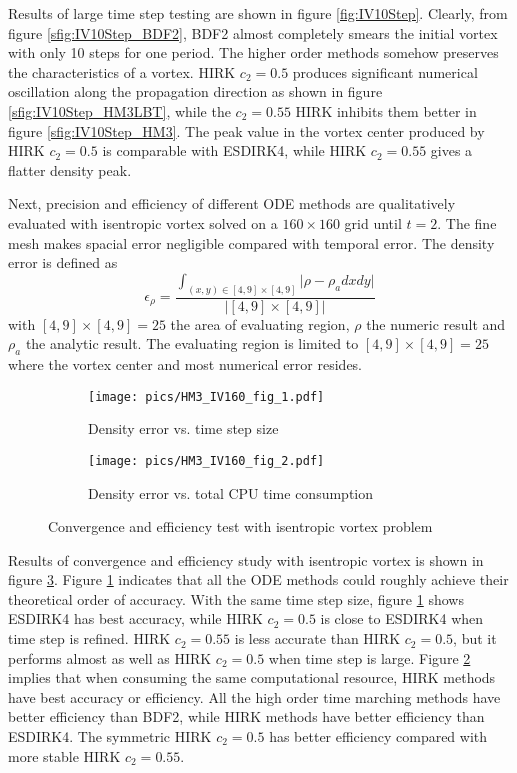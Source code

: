 \documentclass[preprint,12pt]{elsarticle}
\begin{document}
Results of large time step testing are shown in figure \ref{fig:IV10Step}.
Clearly, from figure \ref{sfig:IV10Step_BDF2}, BDF2 almost completely
smears the initial vortex with only 10 steps for one period.
The higher order methods somehow preserves the characteristics of
a vortex. HIRK $c_2=0.5$ produces significant numerical oscillation along
the propagation direction as shown in figure \ref{sfig:IV10Step_HM3LBT},
while the $c_2=0.55$ HIRK inhibits them better in figure \ref{sfig:IV10Step_HM3}.
The peak value in the vortex center produced by HIRK $c_2=0.5$ is comparable with
ESDIRK4, while HIRK $c_2=0.55$ gives a flatter density peak.

Next, precision and efficiency of different ODE methods are
qualitatively evaluated with isentropic vortex solved on a $160\times160$
grid until $t=2$.
The fine mesh makes spacial error negligible compared with
temporal error.
The density error is defined as
\begin{equation}
    \epsilon_\rho = \frac{\int_{(x,y)\in[4,9]\times[4,9]}{|\rho-\rho_a dxdy}|}{
    |[4,9]\times[4,9]|
    }
\end{equation}
with $[4,9]\times[4,9]=25$ the area of evaluating region, $\rho$ the numeric result
and $\rho_a$ the analytic result.
The evaluating region is limited to $[4,9]\times[4,9]=25$
where the vortex center
and most numerical error resides.



\begin{figure}[htbp]
    \centering
    \begin{subfigure}{0.5\textwidth}
        \texttt{[image: pics/HM3\_IV160\_fig\_1.pdf]}
        \caption[]{Density error vs. time step size }
        \label{sfig:IVTests_Conv}
    \end{subfigure}\hfill
    \begin{subfigure}{0.5\textwidth}
        \texttt{[image: pics/HM3\_IV160\_fig\_2.pdf]}
        \caption[]{Density error vs. total CPU time consumption}
        \label{sfig:IVTests_Eff}
    \end{subfigure}
    \caption[]{Convergence and efficiency test with isentropic vortex problem}
    \label{fig:IVTests}
\end{figure}

Results of convergence and efficiency study with isentropic vortex is
shown in figure \ref{fig:IVTests}.
Figure \ref{sfig:IVTests_Conv} indicates that all the ODE methods
could roughly achieve their theoretical order of accuracy.
With the same time step size, figure \ref{sfig:IVTests_Conv} shows
ESDIRK4 has best accuracy, while HIRK $c_2=0.5$ is close to
ESDIRK4 when time step is refined. HIRK $c_2=0.55$ is less accurate
than HIRK $c_2=0.5$, but it performs almost as well as
HIRK $c_2=0.5$ when time step is large.
Figure \ref{sfig:IVTests_Eff}
implies that when consuming the same computational resource,
HIRK methods have best accuracy or efficiency. All the high order
time marching methods have better efficiency than BDF2,
while HIRK methods have better efficiency than ESDIRK4.
The symmetric HIRK $c_2=0.5$ has better efficiency
compared with more stable HIRK $c_2=0.55$.
\end{document}
